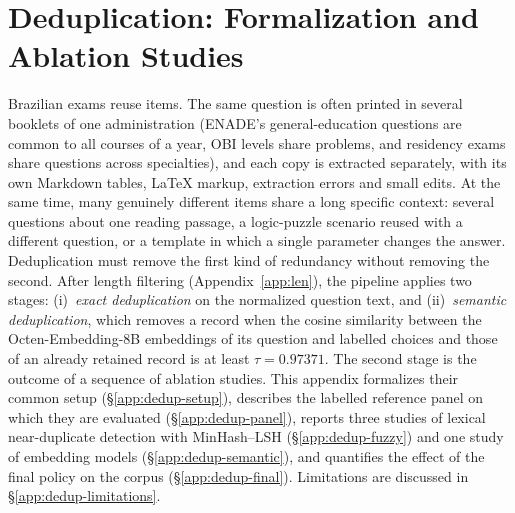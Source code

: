 %
%
\providecommand{\DedupAblationFigDir}{figures}

\section{Deduplication: Formalization and Ablation Studies}
\label{app:dedup}

Brazilian exams reuse items. The same question is often printed in several
booklets of one administration (ENADE's general-education questions are common
to all courses of a year, OBI levels share problems, and residency exams share
questions across specialties), and each copy is extracted separately, with its
own Markdown tables, \LaTeX{} markup, extraction errors and small edits. At
the same time, many genuinely different items share a long specific context:
several questions about one reading passage, a logic-puzzle scenario reused
with a different question, or a template in which a single parameter changes
the answer. Deduplication must remove the first kind of redundancy without
removing the second. After length filtering (Appendix~\ref{app:len}), the
pipeline applies two stages: (i)~\emph{exact deduplication} on the normalized
question text, and (ii)~\emph{semantic deduplication}, which removes a record
when the cosine similarity between the Octen-Embedding-8B embeddings of its
question and labelled choices and those of an already retained record is at
least $\tau = 0.97371$. The second stage is the outcome of a sequence of
ablation studies. This appendix formalizes their common setup
(\S\ref{app:dedup-setup}), describes the labelled reference panel on which
they are evaluated (\S\ref{app:dedup-panel}), reports three studies of lexical
near-duplicate detection with MinHash--LSH (\S\ref{app:dedup-fuzzy}) and one
study of embedding models (\S\ref{app:dedup-semantic}), and quantifies the
effect of the final policy on the corpus (\S\ref{app:dedup-final}).
Limitations are discussed in \S\ref{app:dedup-limitations}.

